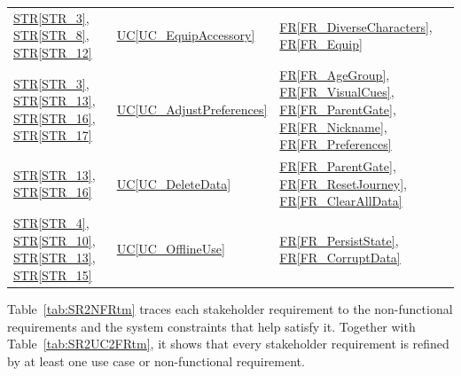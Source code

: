 \documentclass[10pt]{article}
\newcommand{\strref}[1]{\hyperref[#1]{STR\ref*{#1}}}
\newcommand{\ucref}[1]{\hyperref[#1]{UC\ref*{#1}}}
\newcommand{\rref}[1]{\hyperref[#1]{FR\ref*{#1}}}
\begin{document}
\begin{longtable}{@{}p{} p{} p{}@{}}
\strref{STR_3}, \strref{STR_8}, \strref{STR_12} 
& \ucref{UC_EquipAccessory} & \rref{FR_DiverseCharacters}, \rref{FR_Equip} \\

\strref{STR_3}, \strref{STR_13}, \strref{STR_16}, \strref{STR_17} 
& \ucref{UC_AdjustPreferences} & \rref{FR_AgeGroup}, \rref{FR_VisualCues}, \rref{FR_ParentGate}, \rref{FR_Nickname}, \rref{FR_Preferences} \\

\strref{STR_13}, \strref{STR_16} & \ucref{UC_DeleteData} & \rref{FR_ParentGate}, \rref{FR_ResetJourney}, \rref{FR_ClearAllData} \\

\strref{STR_4}, \strref{STR_10}, \strref{STR_13}, \strref{STR_15} & \ucref{UC_OfflineUse} 
& \rref{FR_PersistState}, \rref{FR_CorruptData} \\
\end{longtable}

Table~\ref{tab:SR2NFRtm} traces each stakeholder requirement to the
non-functional requirements and the system constraints that help satisfy it.
Together with Table~\ref{tab:SR2UC2FRtm}, it shows that every stakeholder
requirement is refined by at least one use case or non-functional requirement.
\end{document}
